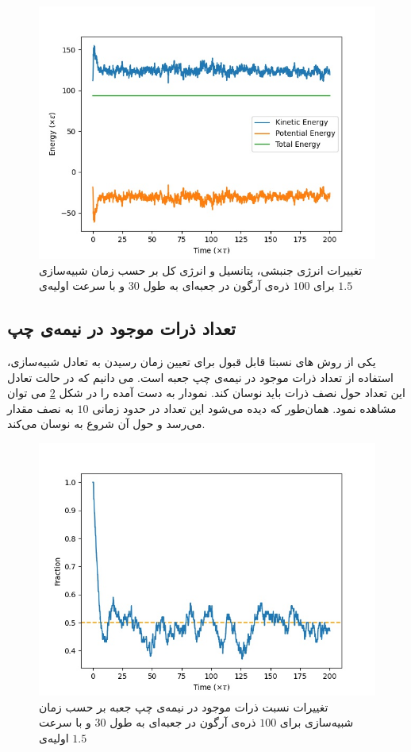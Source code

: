 \documentclass[11pt, a4paper]{article}
\begin{document}
\begin{figure}[h!]
	\centering
  \includegraphics[width=.7\textwidth]{MD_30_100_2_0.001_energies.jpg}
  \caption{تغییرات انرژی جنبشی، پتانسیل و انرژی کل بر حسب زمان شبیه‌سازی برای $100$ ذره‌ی آرگون در جعبه‌ای به طول $30$ و با سرعت اولیه‌ی $1.5$}
  \label{fig:100_energies}
\end{figure}

\subsection{تعداد ذرات موجود در نیمه‌ی چپ}
یکی از روش ‌های نسبتا قابل قبول برای تعیین زمان رسیدن به تعادل شبیه‌سازی،
استفاده از تعداد ذرات موجود در نیمه‌ی چپ جعبه است.
می دانیم که در حالت تعادل این تعداد حول نصف ذرات باید نوسان کند.
نمودار به دست آمده را در شکل
\ref{fig:100_left_side}
می توان مشاهده نمود.
همان‌طور که دیده می‌شود این تعداد در حدود زمانی
$10$
به نصف مقدار می‌رسد و حول آن شروع به نوسان می‌کند.

\begin{figure}[h!]
	\centering
  \includegraphics[width=.7\textwidth]{MD_30_100_2_0.001_left_side_numbers.jpg}
  \caption{تغییرات نسبت ذرات موجود در نیمه‌ی چپ جعبه بر حسب زمان شبیه‌سازی برای $100$ ذره‌ی آرگون در جعبه‌ای به طول $30$ و با سرعت اولیه‌ی $1.5$}
  \label{fig:100_left_side}
\end{figure}
\end{document}
